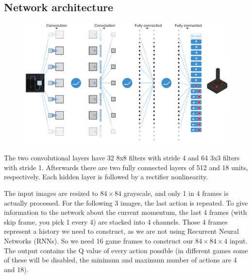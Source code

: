 \documentclass{tufte-handout}
\begin{document}
\subsection{Network architecture}
\begin{figure}[h]
  \centering
  \includegraphics[width=\linewidth]{dqn-net}
  \label{fig:dqn-net}
\end{figure}

The two convolutional layers have 32 8x8 filters with stride 4 and 64 3x3 filters with stride 1. Afterwards there are two fully connected layers of 512 and 18 units, respectively. Each hidden layer is followed by a rectifier nonlinearity. 

The input images are resized to $84\times84$ grayscale, and only 1 in 4 frames is actually processed. For the following 3 images, the last action is repeated. To give information to the network about the current momentum, the last 4 frames (with skip frame, you pick 1 every 4) are stacked into 4 channels. Those 4 frames represent a history we need to construct, as we are not using Recurrent Neural Networks (RNNs). So we need 16 game frames to construct our $84\times84\times4$ input. The output contains the Q value of every action possible (in different games some of these will be disabled, the minimum and maximum number of actions are 4 and 18). 

\end{document}
